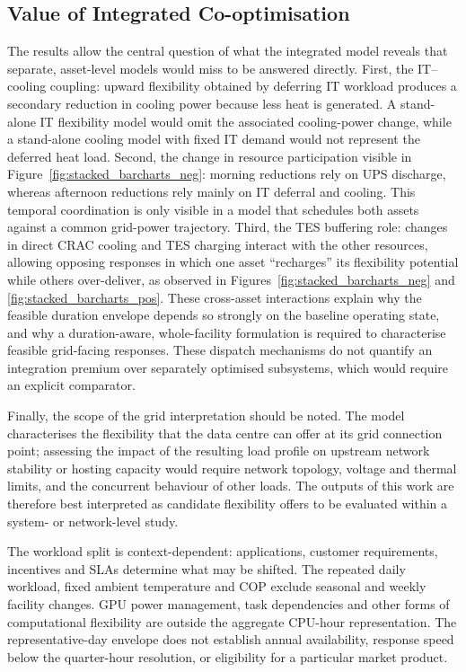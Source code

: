 \documentclass[lettersize,journal]{IEEEtran}
\newcommand{\rev}[1]{#1}
\begin{document}
\subsection{\rev{Value of Integrated Co-optimisation}}\label{sec:integration-value}
\rev{The results allow the central question of what the integrated model reveals that separate, asset-level models would miss to be answered directly. First, the IT--cooling coupling: upward flexibility obtained by deferring IT workload produces a secondary reduction in cooling power because less heat is generated. A stand-alone IT flexibility model would omit the associated cooling-power change, while a stand-alone cooling model with fixed IT demand would not represent the deferred heat load. Second, the change in resource participation visible in Figure~\ref{fig:stacked_barcharts_neg}: morning reductions rely on UPS discharge, whereas afternoon reductions rely mainly on IT deferral and cooling. This temporal coordination is only visible in a model that schedules both assets against a common grid-power trajectory. Third, the TES buffering role: changes in direct CRAC cooling and TES charging interact with the other resources, allowing opposing responses in which one asset ``recharges'' its flexibility potential while others over-deliver, as observed in Figures~\ref{fig:stacked_barcharts_neg} and \ref{fig:stacked_barcharts_pos}. These cross-asset interactions explain why the feasible duration envelope depends so strongly on the baseline operating state, and why a duration-aware, whole-facility formulation is required to characterise feasible grid-facing responses. These dispatch mechanisms do not quantify an integration premium over separately optimised subsystems, which would require an explicit comparator.}

\rev{Finally, the scope of the grid interpretation should be noted. The model characterises the flexibility that the data centre can offer at its grid connection point; assessing the impact of the resulting load profile on upstream network stability or hosting capacity would require network topology, voltage and thermal limits, and the concurrent behaviour of other loads. The outputs of this work are therefore best interpreted as candidate flexibility offers to be evaluated within a system- or network-level study.}

The workload split is context-dependent: applications, customer requirements, incentives and SLAs determine what may be shifted. The repeated daily workload, fixed ambient temperature and COP exclude seasonal and weekly facility changes. GPU power management, task dependencies and other forms of computational flexibility are outside the aggregate CPU-hour representation. The representative-day envelope does not establish annual availability, response speed below the quarter-hour resolution, or eligibility for a particular market product.
\end{document}
